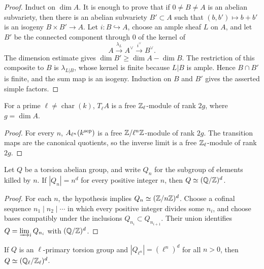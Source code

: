 \begin{proof}
Induct on $\dim A$.  It is enough to prove that if $0\ne B\ne A$ is an
abelian subvariety, then there is an abelian subvariety $B'\subset A$ such
that $(b,b')\mapsto b+b'$ is an isogeny $B\times B'\to A$.  Let
$i:B\hookrightarrow A$, choose an ample sheaf $L$ on $A$, and let $B'$ be
the connected component through $0$ of the kernel of
\[
A\xrightarrow{\lambda_L}A^\vee\xrightarrow{i^\vee}B^\vee.
\]
The dimension estimate gives $\dim B'\geq\dim A-\dim B$.  The restriction
of this composite to $B$ is $\lambda_{L|B}$, whose kernel is finite because
$L|B$ is ample.  Hence $B\cap B'$ is finite, and the sum map is an
isogeny.  Induction on $B$ and $B'$ gives the asserted simple factors.
\end{proof}

\begin{proposition}
\label{prop:milne-tate-rank}

For a prime $\ell\ne\operatorname{char}(k)$, $T_\ell A$ is a free
$\mathbb{Z}_\ell$-module of rank $2g$, where $g=\dim A$.
\end{proposition}

\begin{proof}
For every $n$, $A_{\ell^n}(k^{\rm sep})$ is a free
$\mathbb{Z}/\ell^n\mathbb{Z}$-module of rank $2g$.  The transition maps are the canonical
quotients, so the inverse limit is a free $\mathbb{Z}_\ell$-module of rank $2g$.
\end{proof}

\begin{lemma}
\label{lem:milne-torsion-group}

Let $Q$ be a torsion abelian group, and write $Q_n$ for the subgroup of
elements killed by $n$.  If $|Q_n|=n^d$ for every positive integer $n$, then
$Q\simeq(\mathbb{Q}/\mathbb{Z})^d$.
\end{lemma}

\begin{proof}
For each $n$, the hypothesis implies $Q_n\simeq(\mathbb{Z}/n\mathbb{Z})^d$.  Choose a
cofinal sequence $n_1\mid n_2\mid\cdots$ in which every positive integer
divides some $n_i$, and choose bases compatibly under the inclusions
$Q_{n_i}\subset Q_{n_{i+1}}$.  Their union identifies
$Q=\varinjlim_iQ_{n_i}$ with $(\mathbb{Q}/\mathbb{Z})^d$.
\end{proof}

\begin{lemma}
\label{lem:milne-ell-primary-torsion}

If $Q$ is an $\ell$-primary torsion group and
$|Q_{\ell^n}|=(\ell^n)^d$ for all $n>0$, then
$Q\simeq(\mathbb{Q}_\ell/\mathbb{Z}_\ell)^d$.
\end{lemma}

